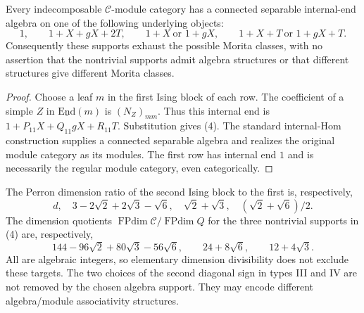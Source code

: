\documentclass[11pt]{article}
\newcommand{\C}{\mathcal C}\newcommand{\I}{\mathcal I}\newcommand{\M}{\mathcal M}
\newcommand{\FPdim}{\operatorname{FPdim}}
\begin{document}
\begin{corollary}
Every indecomposable $\C$-module category has a connected separable
internal-end algebra on one of the following underlying objects:
\[
1,\qquad 1+X+gX+2T,\qquad 1+X\ \text{or }1+gX,
\qquad 1+X+T\ \text{or }1+gX+T. \tag{4}
\]
Consequently these supports exhaust the possible Morita classes, with
no assertion that the nontrivial supports admit algebra structures or
that different structures give different Morita classes.
\end{corollary}
\begin{proof}
Choose a leaf $m$ in the first Ising block of each row. The coefficient
of a simple $Z$ in $\underline{\mathrm{End}}(m)$ is $(N_Z)_{mm}$.
Thus this internal end is
$1+P_{11}X+Q_{11}gX+R_{11}T$. Substitution gives (4).
The standard internal-Hom construction supplies a connected separable
algebra and realizes the original module category as its modules.
The first row has internal end $1$ and is necessarily the regular
module category, even categorically.
\end{proof}

The Perron dimension ratio of the second Ising block to the first is,
respectively,
\[
d,\quad 3-2\sqrt2+2\sqrt3-\sqrt6,\quad
\sqrt2+\sqrt3,\quad(\sqrt2+\sqrt6)/2.
\]
The dimension quotients $\FPdim\C/\FPdim Q$ for the three nontrivial
supports in (4) are, respectively,
\[
144-96\sqrt2+80\sqrt3-56\sqrt6,
\qquad24+8\sqrt6,\qquad12+4\sqrt3.
\]
All are algebraic integers, so elementary dimension divisibility does
not exclude these targets. The two choices of the second diagonal sign
in types III and IV are not removed by the chosen algebra support.
They may encode different algebra/module associativity structures.
\end{document}
